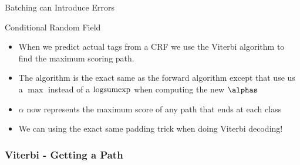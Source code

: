 \documentclass{beamer}
\newcommand{\logsumexp}{\mathop{\rm logsumexp}}
\begin{document}
\begin{section}{Batching can Introduce Errors}
\begin{subsection}{Conditional Random Field}
\begin{frame}
            \begin{itemize}
                \item When we predict actual tags from a CRF we use the Viterbi algorithm to find the maximum scoring
                    path.
                \item The algorithm is the exact same as the forward algorithm except that use us a $\max$ instead of a
                    $\logsumexp$ when computing the new $\alphas$
                \item $\alpha$ now represents the maximum score of any path that ends at each class
                \item We can using the exact same padding trick when doing Viterbi decoding!
            \end{itemize}
        \end{frame}

        \begin{frame}
            \frametitle{Viterbi - Getting a Path}


\end{frame}
\end{subsection}
\end{section}
\end{document}
